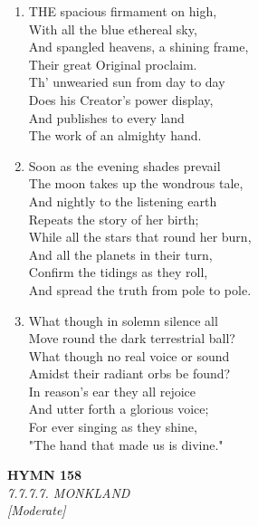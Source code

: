 \documentclass[11pt,a4paper]{article}
\begin{document}
\begin{enumerate}
    \item THE spacious firmament on high, \\
        With all the blue ethereal sky, \\
        And spangled heavens, a shining frame, \\
        Their great Original proclaim. \\
        Th' unwearied sun from day to day \\
        Does his Creator's power display, \\
        And publishes to every land \\
        The work of an almighty hand.

    \item Soon as the evening shades prevail \\
        The moon takes up the wondrous tale, \\
        And nightly to the listening earth \\
        Repeats the story of her birth; \\
        While all the stars that round her burn, \\
        And all the planets in their turn, \\
        Confirm the tidings as they roll, \\
        And spread the truth from pole to pole.

    \item What though in solemn silence all \\
        Move round the dark terrestrial ball? \\
        What though no real voice or sound \\
        Amidst their radiant orbs be found? \\
        In reason's ear they all rejoice \\
        And utter forth a glorious voice; \\
        For ever singing as they shine, \\
        "The hand that made us is divine."

\end{enumerate}

\newpage
\begin{center}
    {\Large \textbf{HYMN 158}}
    \\
    \textit{7.7.7.7. MONKLAND}
    \\
    \textit{\small [Moderate]}
\end{center}
\vspace{1em}
\end{document}
